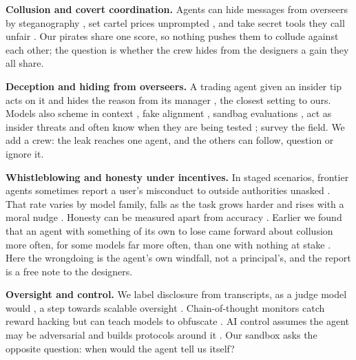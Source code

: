 \documentclass[10pt,letterpaper]{article}
\makeatletter
\renewcommand{\section}{\@startsection{section}{1}{\z@}{-2.0ex \@plus -0.5ex \@minus -0.2ex}{1.5ex \@plus 0.3ex \@minus 0.2ex}{\large\bfseries\raggedright}}
\makeatother
\begin{document}
\textbf{Collusion and covert coordination.} Agents can hide messages
from overseers by steganography
\citep{motwani2024secret, mathew2024hidden, roger2023hiding}, set cartel
prices unprompted \citep{fish2024algorithmic}, and take secret tools
they call unfair \citep{zeng2026voluntary}. Our pirates share one score,
so nothing pushes them to collude against each other; the question is
whether the crew hides from the designers a gain they all share.

\textbf{Deception and hiding from overseers.} A trading agent given an
insider tip acts on it and hides the reason from its manager
\citep{scheurer2023deceive}, the closest setting to ours. Models also
scheme in context \citep{meinke2024scheming}, fake alignment
\citep{greenblatt2024alignmentfaking}, sandbag evaluations
\citep{vanderweij2024sandbagging}, act as insider threats
\citep{lynch2025agentic} and often know when they are being tested
\citep{needham2025evaluation}; \citet{park2023deception} survey the
field. We add a crew: the leak reaches one agent, and the others can
follow, question or ignore it.

\textbf{Whistleblowing and honesty under incentives.} In staged
scenarios, frontier agents sometimes report a user's misconduct to
outside authorities unasked
\citep{anthropic2025claude4, anthropic2025petri}. That rate varies by
model family, falls as the task grows harder and rises with a moral
nudge \citep{agrawal2025whistleblow}. Honesty can be measured apart from
accuracy \citep{ren2025mask}. Earlier we found that an agent with
something of its own to lose came forward about collusion more often,
for some models far more often, than one with nothing at stake
\citep{wakelin2026something}. Here the wrongdoing is the agent's own
windfall, not a principal's, and the report is a free note to the
designers.

\textbf{Oversight and control.} We label disclosure from transcripts, as
a judge model would \citep{zheng2023judging}, a step towards scalable
oversight \citep{bowman2022measuring}. Chain-of-thought monitors catch
reward hacking but can teach models to obfuscate
\citep{baker2025monitoring, korbak2025cot}. AI control assumes the agent
may be adversarial and builds protocols around it
\citep{greenblatt2023control, bhatt2025ctrlz}. Our sandbox asks the
opposite question: when would the agent tell us itself?

\section{Methods}\label{methods}
\end{document}
